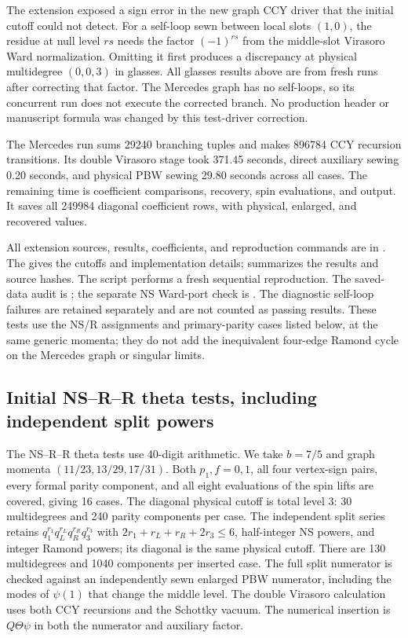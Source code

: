 \documentclass[11pt]{article}
\numberwithin{equation}{section}
\begin{document}
The extension exposed a sign error in the new graph CCY driver that the
initial cutoff could not detect. For a self-loop sewn between local slots
$(1,0)$, the residue at null level $rs$ needs the factor $(-1)^{rs}$ from
the middle-slot Virasoro Ward normalization. Omitting it first produces
a discrepancy at physical multidegree $(0,0,3)$ in glasses. All glasses
results above are from fresh runs after correcting that factor. The
Mercedes graph has no self-loops, so its concurrent run does not execute
the corrected branch. No production header or manuscript formula was
changed by this test-driver correction.

The Mercedes run sums 29240 branching tuples and makes 896784 CCY
recursion transitions. Its double Virasoro stage took 371.45 seconds,
direct auxiliary sewing 0.20 seconds, and physical PBW sewing 29.80 seconds
across all cases. The remaining time is coefficient comparisons, recovery,
spin evaluations, and output. It saves all 249984 diagonal coefficient
rows, with physical, enlarged, and recovered values.

All extension sources, results, coefficients, and reproduction commands
are in .
The  gives the cutoffs and implementation details;
 summarizes the results and source hashes.
The script  performs a fresh sequential reproduction.
The saved-data audit is ;
the separate NS Ward-port check is .
The diagnostic self-loop failures are retained separately and are not
counted as passing results. These tests use the NS/R assignments
and primary-parity cases listed below, at the same generic momenta; they do
not add the inequivalent four-edge Ramond cycle on the Mercedes graph or singular limits.



\subsection{Initial NS--R--R theta tests, including independent split powers}

The NS--R--R theta tests use 40-digit arithmetic. We take $b=7/5$ and
graph momenta $(11/23,13/29,17/31)$. Both $p_1,f=0,1$, all four vertex-sign
pairs, every formal parity component, and all eight evaluations of the
spin lifts are covered, giving 16 cases. The diagonal physical cutoff is
total level 3: 30 multidegrees and 240 parity components per case.
The independent split series retains
$q_1^{r_1}q_L^{r_L}q_R^{r_R}q_3^{r_3}$ with
$2r_1+r_L+r_R+2r_3\le6$, half-integer NS powers, and integer Ramond
powers; its diagonal is the same physical cutoff. There are 130 multidegrees and
1040 components per inserted case. The full split numerator is
checked against an independently sewn enlarged PBW numerator, including
the modes of $\psi(1)$ that change the middle level. The double Virasoro
calculation uses both CCY recursions and the Schottky vacuum. The numerical
insertion is $Q\Theta\psi$ in both the numerator and auxiliary factor.
\end{document}
